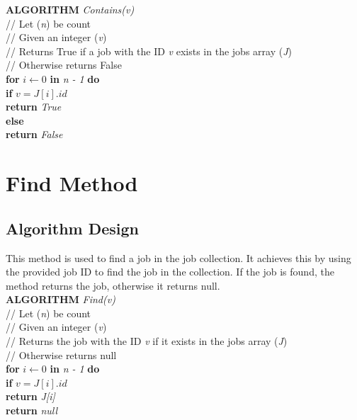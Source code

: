 \documentclass[12pt,a4paper]{article}
\begin{document}
			\textbf{ALGORITHM} \textit{Contains(v)}\\
			\null\hspace{1cm}// Let (\textit{n}) be count\\
			\null\hspace{1cm}// Given an integer (\textit{v})\\
			\null\hspace{1cm}// Returns True if a job with the ID \textit{v} exists in the jobs array (\textit{J})\\
			\null\hspace{1cm}// Otherwise returns False\\
			\null\hspace{1cm}\textbf{for} \textit{$i \gets 0$} \textbf{in} \textit{n - 1} \textbf{do}\\
			\null\hspace{2cm}\textbf{if} \textit{$v = J[i].id$}\\
			\null\hspace{3cm}\textbf{return} \textit{True}\\
			\null\hspace{1cm}\textbf{else}\\
			\null\hspace{2cm}\textbf{return} \textit{False}
			
	\newpage

	\section{Find Method}
		\subsection{Algorithm Design}
			This method is used to find a job in the job collection. It achieves this by using the provided 
			job ID to find the job in the collection. If the job is found, the method returns the job, 
			otherwise it returns null.\\

			\textbf{ALGORITHM} \textit{Find(v)}\\
			\null\hspace{1cm}// Let (\textit{n}) be count\\
			\null\hspace{1cm}// Given an integer (\textit{v})\\
			\null\hspace{1cm}// Returns the job with the ID \textit{v} if it exists in the jobs array (\textit{J})\\
			\null\hspace{1cm}// Otherwise returns null\\
			\null\hspace{1cm}\textbf{for} \textit{$i \gets 0$} \textbf{in} \textit{n - 1} \textbf{do}\\
			\null\hspace{2cm}\textbf{if} \textit{$v = J[i].id$}\\
			\null\hspace{3cm}\textbf{return} \textit{J[i]}\\
			\null\hspace{1cm}\textbf{return} \textit{null}\\
\end{document}
